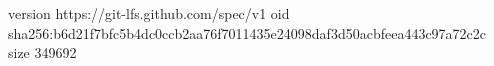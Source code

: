 version https://git-lfs.github.com/spec/v1
oid sha256:b6d21f7bfc5b4dc0ccb2aa76f7011435e24098daf3d50acbfeea443c97a72c2c
size 349692
